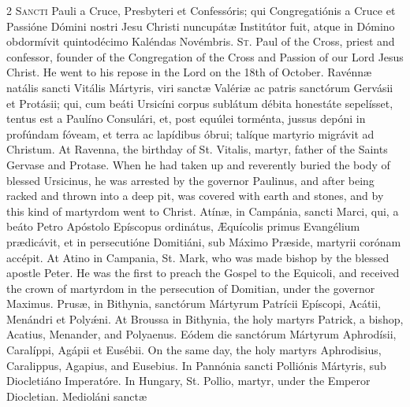 \begin{paracol}{2}
\lettrine[lines=2]{S}{ancti} Pauli a Cruce, 
 Presbyteri et Confessóris; qui Congregatiónis a Cruce et Passióne Dómini 
 nostri Jesu Christi nuncupátæ Institútor fuit, atque in Dómino obdormívit 
 quintodécimo Kaléndas Novémbris.
\switchcolumn
{}
\lettrine[lines=2]{S}{t.} Paul of the Cross, priest and 
 confessor, founder of the Congregation of the Cross and Passion of our Lord 
 Jesus Christ. He went to his repose in the Lord on the 18th of 
 October.
\switchcolumn*
{}
Ravénnæ natális sancti 
 Vitális Mártyris, viri sanctæ Valériæ ac patris sanctórum Gervásii et 
 Protásii; qui, cum beáti Ursicíni corpus sublátum débita honestáte 
 sepelísset, tentus est a Paulíno Consulári, et, post equúlei torménta, 
 jussus depóni in profúndam fóveam, et terra ac lapídibus óbrui; talíque 
 martyrio migrávit ad Christum.
\switchcolumn
{}
At Ravenna, the birthday of St. 
 Vitalis, martyr, father of the Saints Gervase and Protase. When he had 
 taken up and reverently buried the body of blessed Ursicinus, he was 
 arrested by the governor Paulinus, and after being racked and thrown into a 
 deep pit, was covered with earth and stones, and by this kind of martyrdom went 
 to Christ.
\switchcolumn*
{}
Atínæ, in Campánia, 
 sancti Marci, qui, a beáto Petro Apóstolo Epíscopus ordinátus, Æquícolis 
 primus Evangélium prædicávit, et in persecutióne Domitiáni, sub Máximo 
 Præside, martyrii corónam accépit.
\switchcolumn
{}
At Atino in Campania, St. Mark, who 
 was made bishop by the blessed apostle Peter. He was the first to 
 preach the Gospel to the Equicoli, and received the crown of martyrdom in 
 the persecution of Domitian, under the governor Maximus.
\switchcolumn*
{}
Prusæ, in Bithynia, 
 sanctórum Mártyrum Patrícii Epíscopi, Acátii, Menándri et Polyǽni.
\switchcolumn
{}
At Broussa in Bithynia, the holy 
 martyrs Patrick, a bishop, Acatius, Menander, and Polyaenus.
\switchcolumn*
{}
Eódem die sanctórum 
 Mártyrum Aphrodísii, Caralíppi, Agápii et Eusébii.
\switchcolumn
{}
On the same day, the holy martyrs 
 Aphrodisius, Caralippus, Agapius, and Eusebius.
\switchcolumn*
{}
In Pannónia sancti 
 Polliónis Mártyris, sub Diocletiáno Imperatóre.
\switchcolumn
{}
In Hungary, St. Pollio, martyr, 
 under the Emperor Diocletian.
\switchcolumn*
{}
Medioláni sanctæ 

\end{paracol}
